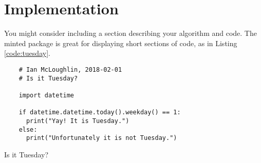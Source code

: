 \chapter{Implementation}
You might consider including a section describing your algorithm and code.
The minted package is great for displaying short sections of code, as in 
Listing \ref{code:tuesday}.

\lipsum[29]

\begin{listing}
  \begin{verbatim}
    # Ian McLoughlin, 2018-02-01
    # Is it Tuesday?

    import datetime

    if datetime.datetime.today().weekday() == 1:
      print("Yay! It is Tuesday.")
    else:
      print("Unfortunately it is not Tuesday.")
  \end{verbatim}
  \caption{Is it Tuesday?}
  \label{code:tuesday}
\end{listing}

\lipsum[10-15]